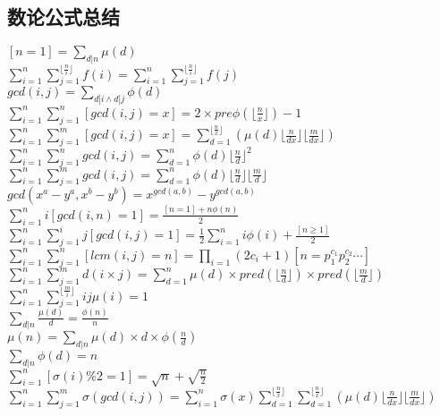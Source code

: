 \documentclass[twocolumn,a4]{article}
\begin{document}
\subsection{数论公式总结}
\begin{large}
    $\displaystyle [n=1]=\sum_{d|n}\mu (d)$\\
    $\displaystyle \sum_{i=1}^n\sum_{j=1}^{\lfloor \frac{n}{i} \rfloor }f(i)=\sum_{i=1}^{n}\sum_{j=1}^{\lfloor \frac{n}{i} \rfloor}f(j)$\\
    $\displaystyle gcd(i,j)=\sum_{d|i \wedge  d|j}\phi (d)$\\
    $\displaystyle \sum_{i=1}^{n}\sum_{j=1}^{n}[gcd(i,j)=x]=2 \times pre\phi (\lfloor \frac{n}{x} \rfloor)-1$\\
    $\displaystyle \sum_{i=1}^{n}\sum_{j=1}^{m}[gcd(i,j)=x]=\sum_{d=1}^{\lfloor \frac{n}{x} \rfloor}\left(\mu(d) \lfloor \frac{n}{dx} \rfloor  \lfloor \frac{m}{dx} \rfloor\right)$\\
    $\displaystyle \sum_{i=1}^{n}\sum_{j=1}^{n}gcd(i,j)=\sum_{d=1}^{n}\phi(d){\lfloor \frac{n}{d} \rfloor}^2$\\
    $\displaystyle \sum_{i=1}^{n}\sum_{j=1}^{m}gcd(i,j)=\sum_{d=1}^{n}\phi(d){\lfloor \frac{n}{d} \rfloor}{\lfloor \frac{m}{d} \rfloor}$\\
    $\displaystyle gcd(x^a-y^a,x^b-y^b)=x^{gcd(a,b)}-y^{gcd(a,b)}$\\
    $\displaystyle \sum_{i=1}^{n}i[gcd(i,n)=1]=\frac{[n=1]+n\phi(n)}{2}$
    $\displaystyle\sum_{i=1}^{n}\sum_{j=1}^{i}j[gcd(i,j)=1]=\frac{1}{2}\sum_{i=1}^{n}i\phi(i)+\frac{[n \geq 1]}{2}$\\
    $\displaystyle \sum_{i=1}^{n}\sum_{j=1}^{n}[lcm(i,j)=n]=\prod_{i=1} (2c_i+1)$$[n=p_1^{c_1}p_2^{c_2}\cdots]$\\
    $\displaystyle \sum_{i=1}^{n}\sum_{j=1}^{m}d(i\times j)=\sum_{d=1}^{n}\mu(d)\times pred(\lfloor \frac{n}{d} \rfloor) \times pred(\lfloor \frac{m}{d}\rfloor)$\\
    $\displaystyle \sum_{i=1}^{n}\sum_{j=1}^{\lfloor \frac{m}{i} \rfloor}ij\mu(i)=1$\\
    $\displaystyle \sum_{d|n}\frac{\mu(d)}{d}=\frac{\phi(n)}{n}$\\
    $\displaystyle \mu(n)=\sum_{d|n}\mu(d)\times d\times \phi(\frac{n}{d})$\\
    $\displaystyle \sum_{d|n}\phi(d)=n$\\
    $\displaystyle \sum_{i=1}^{n}[\sigma(i)\%2=1]=\sqrt{n}+\sqrt{\frac{n}{2}}$\\
    $\displaystyle \sum_{i=1}^{n}\sum_{j=1}^{m}\sigma (gcd(i,j))=\sum_{i=1}^{n}\sigma(x)\sum_{d=1}^{\lfloor \frac{n}{x} \rfloor}\sum_{d=1}^{\lfloor \frac{n}{x} \rfloor}\left(\mu(d) \lfloor \frac{n}{dx} \rfloor  \lfloor \frac{m}{dx} \rfloor\right)$\\
$$
\end{large}
\end{document}
